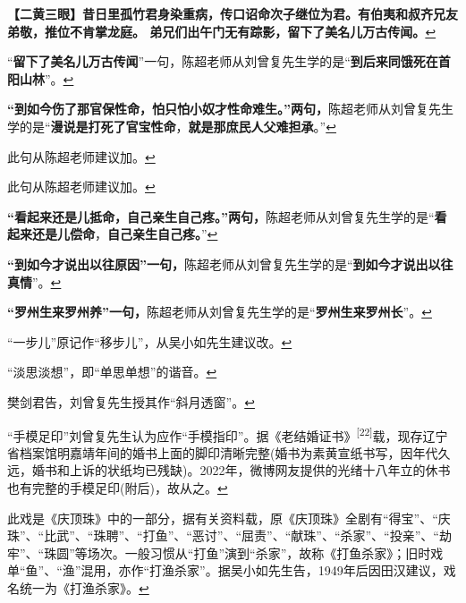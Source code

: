   \textbf{【二黄三眼】昔日里孤竹君身染重病，传口诏命次子继位为君。有伯夷和叔齐兄友弟敬，推位不肯掌龙庭。
  弟兄们出午门无有踪影，留下了美名儿万古传闻。}\protect\hyperlink{fnref502}{↩}
\item
  \leavevmode\hypertarget{fn503}{}%
  ``\textbf{留下了美名儿万古传闻}''一句，陈超老师从刘曾复先生学的是``\textbf{到后来同饿死在首阳山林}''。\protect\hyperlink{fnref503}{↩}
\item
  \leavevmode\hypertarget{fn504}{}%
  \textbf{``到如今伤了那官保性命，怕只怕小奴才性命难生。''两句，}陈超老师从刘曾复先生学的是``\textbf{漫说是打死了官宝性命}，\textbf{就是那庶民人父难担承}。''\protect\hyperlink{fnref504}{↩}
\item
  \leavevmode\hypertarget{fn505}{}%
  此句从陈超老师建议加。\protect\hyperlink{fnref505}{↩}
\item
  \leavevmode\hypertarget{fn506}{}%
  此句从陈超老师建议加。\protect\hyperlink{fnref506}{↩}
\item
  \leavevmode\hypertarget{fn507}{}%
  \textbf{``看起来还是儿抵命，自己亲生自己疼。''两句，}陈超老师从刘曾复先生学的是``\textbf{看起来还是儿偿命}，\textbf{自己亲生自己疼。}''\protect\hyperlink{fnref507}{↩}
\item
  \leavevmode\hypertarget{fn508}{}%
  \textbf{``到如今才说出以往原因''一句，}陈超老师从刘曾复先生学的是``\textbf{到如今才说出以往真情}''。\protect\hyperlink{fnref508}{↩}
\item
  \leavevmode\hypertarget{fn509}{}%
  \textbf{``罗州生来罗州养''一句，}陈超老师从刘曾复先生学的是``\textbf{罗州生来罗州长}''。\protect\hyperlink{fnref509}{↩}
\item
  \leavevmode\hypertarget{fn510}{}%
  ``一步儿''原记作``移步儿''，从吴小如先生建议改。\protect\hyperlink{fnref510}{↩}
\item
  \leavevmode\hypertarget{fn511}{}%
  ``淡思淡想''，即``单思单想''的谐音。\protect\hyperlink{fnref511}{↩}
\item
  \leavevmode\hypertarget{fn512}{}%
  樊剑君告，刘曾复先生授其作``斜月透窗''。\protect\hyperlink{fnref512}{↩}
\item
  \leavevmode\hypertarget{fn513}{}%
  ``手模足印''刘曾复先生认为应作``手模指印''。据《老结婚证书》\textsuperscript{{[}22{]}}载，现存辽宁省档案馆明嘉靖年间的婚书上面的脚印清晰完整(婚书为素黄宣纸书写，因年代久远，婚书和上诉的状纸均已残缺)。2022年，微博网友提供的光绪十八年立的休书也有完整的手模足印(附后)，故从之。\protect\hyperlink{fnref513}{↩}
\item
  \leavevmode\hypertarget{fn514}{}%
  此戏是《庆顶珠》中的一部分，据有关资料载，原《庆顶珠》全剧有``得宝''、``庆珠''、``比武''、``珠聘''、``打鱼''、``恶讨''、``屈责''、``献珠''、``杀家''、``投亲''、``劫牢''、``珠圆''等场次。一般习惯从``打鱼''演到``杀家''，故称《打鱼杀家》；旧时戏单``鱼''、``渔''混用，亦作``打渔杀家''。据吴小如先生告，1949年后因田汉建议，戏名统一为《打渔杀家》。\protect\hyperlink{fnref514}{↩}
